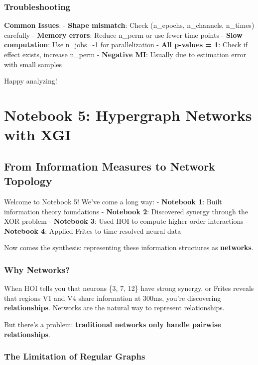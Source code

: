 \documentclass[
  11pt,
  letterpaper,
  oneside,
  openany]{book}
\begin{document}
\subsection{Troubleshooting}\label{troubleshooting}

\textbf{Common Issues}: - \textbf{Shape mismatch}: Check (n\_epochs,
n\_channels, n\_times) carefully - \textbf{Memory errors}: Reduce
n\_perm or use fewer time points - \textbf{Slow computation}: Use
n\_jobs=-1 for parallelization - \textbf{All p-values = 1}: Check if
effect exists, increase n\_perm - \textbf{Negative MI}: Usually due to
estimation error with small samples

Happy analyzing! 🧠✨

\chapter{Notebook 5: Hypergraph Networks with
XGI}\label{notebook-5-hypergraph-networks-with-xgi}

\section{From Information Measures to Network
Topology}\label{from-information-measures-to-network-topology}

Welcome to Notebook 5! We've come a long way: - \textbf{Notebook 1}:
Built information theory foundations - \textbf{Notebook 2}: Discovered
synergy through the XOR problem - \textbf{Notebook 3}: Used HOI to
compute higher-order interactions - \textbf{Notebook 4}: Applied Frites
to time-resolved neural data

Now comes the synthesis: representing these information structures as
\textbf{networks}.

\subsection{Why Networks?}\label{why-networks}

When HOI tells you that neurons \{3, 7, 12\} have strong synergy, or
Frites reveals that regions V1 and V4 share information at 300ms, you're
discovering \textbf{relationships}. Networks are the natural way to
represent relationships.

But there's a problem: \textbf{traditional networks only handle pairwise
relationships}.

\subsection{The Limitation of Regular
Graphs}\label{the-limitation-of-regular-graphs}
\end{document}
